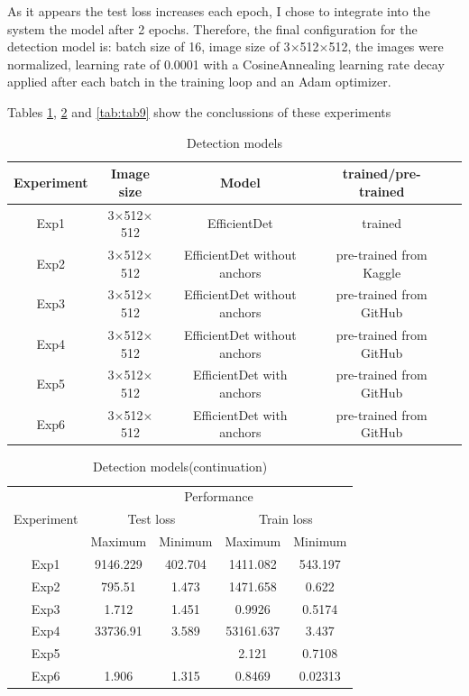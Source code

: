 As it appears the test loss increases each epoch, I chose to integrate into the system the model after 2 epochs. Therefore, the final configuration for the detection model is: batch size of 16, image size of 3$\times$512$\times$512, the images were normalized, learning rate of 0.0001 with a CosineAnnealing learning rate decay applied after each batch in the training loop and an Adam optimizer.

Tables \ref{tab:tab7}, \ref{tab:tab8} and \ref{tab:tab9} show the conclussions of these experiments

\begin{table}[!ht]
    \centering
    \begin{tabular}{|c|c|c|c|c|}
        \hline
        Experiment  & Image size & Model & trained/pre-trained\\
        \hline\hline
        Exp1 & 3$\times$512$\times$512 & EfficientDet & trained\\
        \hline
        Exp2 & 3$\times$512$\times$512 & EfficientDet without anchors & pre-trained from Kaggle\\
        \hline
        Exp3 & 3$\times$512$\times$512 & EfficientDet without anchors & pre-trained from GitHub \\
        \hline
        Exp4 & 3$\times$512$\times$512 & EfficientDet without anchors & pre-trained from GitHub \\
        \hline
        Exp5 & 3$\times$512$\times$512 & EfficientDet with anchors & pre-trained from GitHub \\
        \hline 
        Exp6 & 3$\times$512$\times$512 & EfficientDet with anchors & pre-trained from GitHub \\
        \hline
    \end{tabular}
    \caption{Detection models}
    \label{tab:tab7}
\end{table}

\begin{table}[H]
    \centering
    \begin{tabular}{|c|c|c|c|c|}
        \hline
        \multirow{3}{5em}{Experiment}  & \multicolumn{4}{c|}{Performance}
        \\ \cline{2-5}
         & \multicolumn{2}{c|}{Test loss} & \multicolumn{2}{c|}{Train loss}
         \\ \cline{2-5}
         & Maximum & Minimum & Maximum & Minimum \\
        \hline \hline
        Exp1 & 9146.229 & 402.704 & 1411.082 & 543.197 \\ \hline
        Exp2 & 795.51 & 1.473 & 1471.658 & 0.622 \\ \hline
        Exp3 & 1.712 & 1.451 & 0.9926 & 0.5174 \\ \hline
        Exp4 & 33736.91 & 3.589 & 53161.637 & 3.437\\ \hline
        Exp5 & & & 2.121 & 0.7108 \\ \hline
        Exp6 & 1.906 & 1.315 & 0.8469 & 0.02313\\ \hline

    \end{tabular}
    \caption{Detection models(continuation)}
    \label{tab:tab8}
\end{table}

